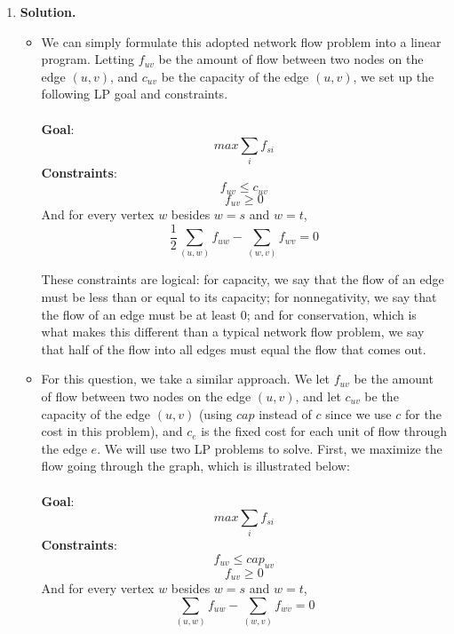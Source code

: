 \documentclass[11pt]{article}
\newcommand\solution{%
  \textbf{Solution.}\\%
}
\begin{document}
\begin{enumerate}
\item 

\solution \begin{itemize}
\item
We can simply formulate this adopted network flow problem into a linear program. Letting $f_{uv}$ be the amount of flow between two nodes on the edge $(u,v)$, and $c_{uv}$ be the capacity of the edge $(u,v)$, we set up the following LP goal and constraints. \\
\\
\textbf{Goal}: 
\begin{equation*}
  max \sum_{i} f_{si}
\end{equation*}
\textbf{Constraints}:
\begin{equation*}
  f_{uv} \leq c_{uv}
\end{equation*}
\begin{equation*}
  f_{uv} \geq 0
\end{equation*}
And for every vertex $w$ besides $w = s$ and $w = t$,
\begin{equation*}
  \frac{1}{2} \sum_{(u,w)} f_{uw} - \sum_{(w,v)} f_{wv} = 0
\end{equation*}

These constraints are logical: for capacity, we say that the flow of an edge must be less than or equal to its capacity; for nonnegativity, we say that the flow of an edge must be at least 0; and for conservation, which is what makes this different than a typical network flow problem, we say that half of the flow into all edges must equal the flow that comes out. 
\\
\item
For this question, we take a similar approach. We let $f_{uv}$ be the amount of flow between two nodes on the edge $(u,v)$, and let $c_{uv}$ be the capacity of the edge $(u,v)$ (using $cap$ instead of $c$ since we use $c$ for the cost in this problem), and $c_e$ is the fixed cost for each unit of flow through the edge $e$. We will use two LP problems to solve. First, we maximize the flow going through the graph, which is illustrated below: \\
\\
\textbf{Goal}: 
\begin{equation*}
  max \sum_{i} f_{si}
\end{equation*}
\textbf{Constraints}:
\begin{equation*}
  f_{uv} \leq cap_{uv}
\end{equation*}
\begin{equation*}
  f_{uv} \geq 0
\end{equation*}
And for every vertex $w$ besides $w = s$ and $w = t$,
\begin{equation*}
  \sum_{(u,w)} f_{uw} - \sum_{(w,v)} f_{wv} = 0
\end{equation*}


\end{itemize}
\end{enumerate}
\end{document}
